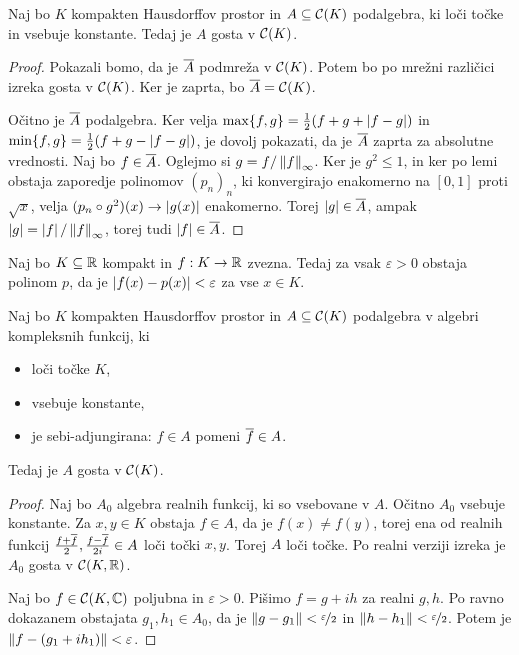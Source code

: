 \begin{izrek}
  Naj bo $K$ kompakten Hausdorffov prostor in $A \subseteq \mathcal{C}(K)$
  podalgebra, ki loči točke in vsebuje konstante.
  Tedaj je $A$ gosta v $\mathcal{C}(K)$.
\end{izrek}

\begin{proof}
  Pokazali bomo, da je $\overline{A}$ podmreža v $\mathcal{C}(K)$.
  Potem bo po mrežni različici izreka gosta v $\mathcal{C}(K)$.
  Ker je zaprta, bo $\overline{A} = \mathcal{C}(K)$.

  Očitno je $\overline{A}$ podalgebra.
  Ker velja $\max\{f,g\} = \frac{1}{2} (f + g + \left| f-g \right|)$ in $\min\{f,g\} = \frac{1}{2}(f+g
  - \left| f-g \right|)$, je dovolj pokazati, da je $\overline{A}$ zaprta za absolutne
  vrednosti.
  Naj bo $f \in \overline{A}$.
  Oglejmo si $g = f / \left\lVert f\right\rVert_\infty$.
  Ker je $g^2 \le 1$, in ker po lemi obstaja zaporedje polinomov $(p_n)_n$, ki
  konvergirajo enakomerno na $[0,1]$ proti $\sqrt{x}$, velja $(p_n \circ g^2)(x)
  \to \left| g(x) \right|$ enakomerno.
  Torej $\left| g \right| \in \overline{A}$, ampak $\left| g \right| = \left| f \right| / \left\lVert f\right\rVert_\infty$, torej
  tudi $\left| f \right| \in \overline{A}$.
\end{proof}


\begin{izrek}[Weierstrass]
  Naj bo $K \subseteq \mathbb{R}$ kompakt in $f: K \to \mathbb{R}$ zvezna.
  Tedaj za vsak $\varepsilon > 0$ obstaja polinom $p$, da je $\left| f(x) - p(x) \right|
  < \varepsilon$ za vse $x \in K$.
\end{izrek}


\begin{izrek}
  Naj bo $K$ kompakten Hausdorffov prostor in $A \subseteq \mathcal{C}(K)$
  podalgebra v algebri kompleksnih funkcij, ki
  \begin{itemize}
  \item loči točke $K$,
  \item vsebuje konstante,
  \item je sebi-adjungirana: $f \in A$ pomeni $\overline{f} \in A$.
  \end{itemize}
  Tedaj je $A$ gosta v $\mathcal{C}(K)$.
\end{izrek}

\begin{proof}
  Naj bo $A_0$ algebra realnih funkcij, ki so vsebovane v $A$.
  Očitno $A_0$ vsebuje konstante.
  Za $x, y \in K$ obstaja $f \in A$, da je $f(x) \ne f(y)$, torej ena od realnih
  funkcij $\frac{f+\overline{f}}{2}, \frac{f-\overline{f}}{2i} \in A$ loči točki $x, y$.
  Torej $A$ loči točke.
  Po realni verziji izreka je $A_0$ gosta v $\mathcal{C}(K, \mathbb{R})$.

  Naj bo $f \in \mathcal{C}(K, \mathbb{C})$ poljubna in $\varepsilon >0$.
  Pišimo $f = g + ih$ za realni $g, h$.
  Po ravno dokazanem obstajata $g_1, h_1 \in A_0$, da je $\left\lVert g - g_1\right\rVert <
  \nicefrac{\varepsilon}{2}$ in $\left\lVert h-h_1\right\rVert < \nicefrac{\varepsilon}{2}$.
  Potem je $\left\lVert f - (g_1 + i h_1)\right\rVert < \varepsilon$.
\end{proof}

